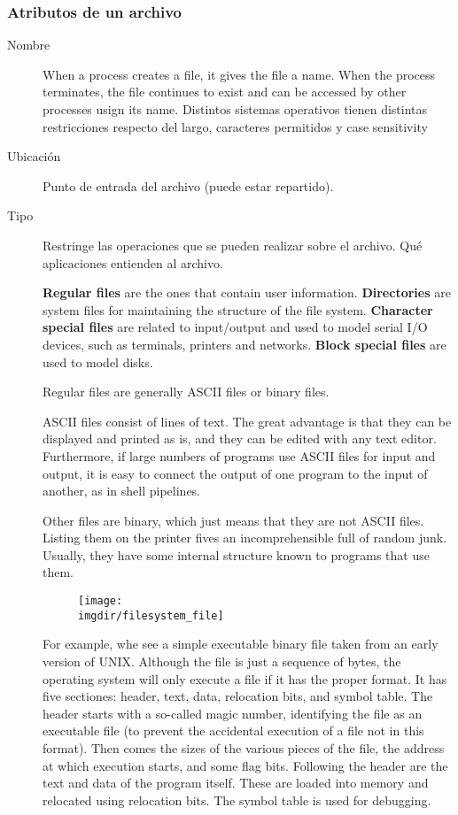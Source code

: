 \documentclass[a4paper, twoside]{article}
\newcommand{\imgdir}{../resources/images} %
\begin{document}
\subsubsection{Atributos de un archivo}
\begin{description}
	\item[Nombre] When a process creates a file, it gives the file a name. When the process terminates, the file continues to exist and can be accessed by other processes usign its name. Distintos sistemas operativos tienen distintas restricciones respecto del largo, caracteres permitidos y case sensitivity
	
	\item[Ubicación] Punto de entrada del archivo (puede estar repartido).

	\item[Tipo] Restringe las operaciones que se pueden realizar sobre el archivo. Qué aplicaciones entienden al archivo.

	\textbf{Regular files} are the ones that contain user information. \textbf{Directories} are system files for maintaining the structure of the file system. \textbf{Character special files} are related to input/output and used to model serial I/O devices, such as terminals, printers and networks. \textbf{Block special files} are used to model disks.

	Regular files are generally ASCII files or binary files. 

	ASCII files consist of lines of text. The great advantage is that they can be displayed and printed as is, and they can be edited with any text editor. Furthermore, if large numbers of programs use ASCII files for input and output, it is easy to connect the output of one program to the input of another, as in shell pipelines.

	Other files are binary, which just means that they are not ASCII files. Listing them on the printer fives an incomprehensible full of random junk. Usually, they have some internal structure known to programs that use them.
	
	\begin{figure}[h]
		\centering
		\texttt{[image: \\imgdir/filesystem\_file]}
		\label{fig:filesystem_file}
	\end{figure}
	
	For example, whe see a simple executable binary file taken from an early version of UNIX. Although the file is just a sequence of bytes, the operating system will only execute a file if it has the proper format. It has five sectiones: header, text, data, relocation bits, and symbol table. The header starts with a so-called magic number, identifying the file as an executable file (to prevent the accidental execution of a file not in this format). Then comes the sizes of the various pieces of the file, the address at which execution starts, and some flag bits. Following the header are the text and data of the program itself. These are loaded into memory and relocated using relocation bits. The symbol table is used for debugging.


\end{description}
\end{document}
